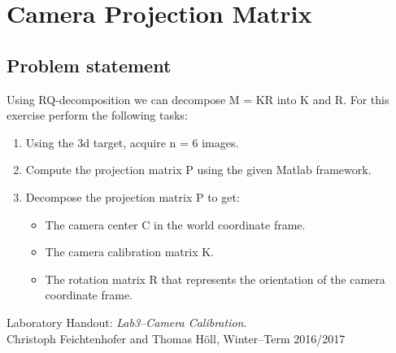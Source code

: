 \documentclass[
a4paper,     %
11pt         %
]{scrartcl}  %
\begin{document}
\FloatBarrier
\section{Camera Projection Matrix}

\subsection{Problem statement}

Using RQ-decomposition we can decompose M = KR into K and R.
For this exercise perform the following tasks:

\begin{enumerate}
 \item Using the 3d target, acquire n = 6 images.
 \item Compute the projection matrix P using the given Matlab framework.
 \item Decompose the projection matrix P to get:
 \begin{itemize}
  \item The camera center C in the world coordinate frame.
  \item The camera calibration matrix K.
  \item The rotation matrix R that represents the orientation of the camera coordinate frame.
 \end{itemize}
\end{enumerate}




\begin{thebibliography}{XX}
  Laboratory Handout: \textit{Lab3--Camera Calibration}. \\
    Christoph Feichtenhofer and Thomas Höll, Winter--Term 2016/2017
\end{thebibliography}
\end{document}
